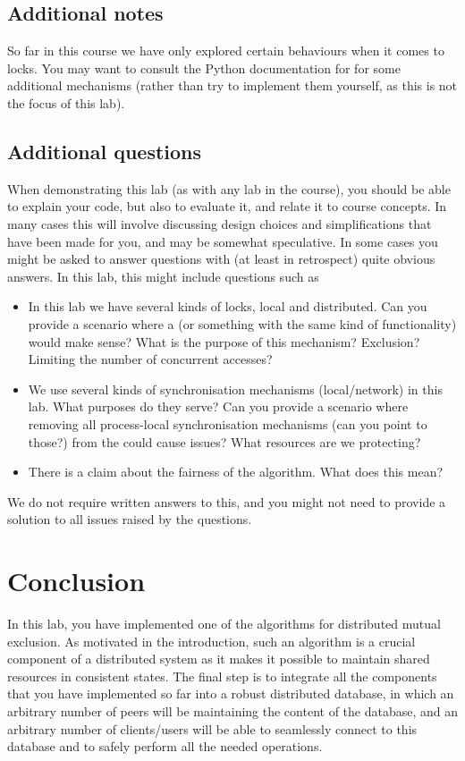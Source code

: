 \documentclass[a4paper]{article}
\begin{document}
\subsection{Additional notes}

So far in this course we have only explored certain behaviours when it
comes to locks. You may want to consult the Python documentation for
 for some additional mechanisms (rather than
try to implement them yourself, as this is not the focus of this
lab).\cite{python-condition}

\subsection{Additional questions}
When demonstrating this lab (as with any lab in the course), you
should be able to explain your code, but also to evaluate it, and
relate it to course concepts. In many cases this will involve
discussing design choices and simplifications that have been made for
you, and may be somewhat speculative. In some cases you might be asked
to answer questions with (at least in retrospect) quite obvious
answers. In this lab, this might include questions such as

\begin{itemize}  
  \item In this lab we have several kinds of locks, local and
    distributed. Can you provide a scenario where a
     (or something with the same kind of
    functionality) would make sense? What is the purpose of this
    mechanism? Exclusion? Limiting the number of concurrent accesses?
  \item We use several kinds of synchronisation mechanisms
    (local/network) in this lab. What purposes do they serve? Can you
    provide a scenario where removing all process-local
    synchronisation mechanisms (can you point to those?) from the
     could cause issues? What resources are
    we protecting?
  \item There is a claim about the fairness of the algorithm. What does this mean?
\end{itemize}

We do not require written answers to this, and you might not need to
provide a solution to all issues raised by the questions.


\section{Conclusion}
In this lab, you have implemented one of the algorithms for distributed mutual
exclusion. As motivated in the introduction, such an algorithm is a crucial
component of a distributed system as it makes it possible to maintain shared
resources in consistent states. The final step is to integrate all the
components that you have implemented so far into a robust distributed database,
in which an arbitrary number of peers will be maintaining the content of the
database, and an arbitrary number of clients/users will be able to seamlessly
connect to this database and to safely perform all the needed operations.

\printbibliography
\end{document}
